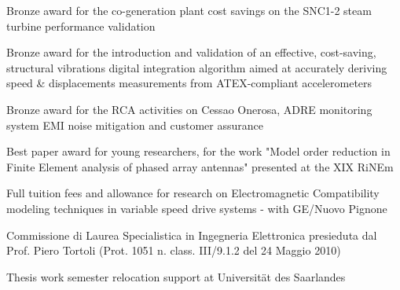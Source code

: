 \documentclass[9pt,a4paper,ragged2e,withhyper]{altacv} %
\begin{document}
\begin{paracol}{2}
{Bronze award for the co-generation plant cost savings on the SNC1-2 steam turbine performance validation}
\divider

{Bronze award for the introduction and validation of an effective, cost-saving, structural vibrations digital integration algorithm aimed at accurately deriving speed \& displacements measurements from ATEX-compliant accelerometers}
\divider

{Bronze award for the RCA activities on Cessao Onerosa, ADRE monitoring system EMI noise mitigation and customer assurance}
\divider

{Best paper award for young researchers, for the work "Model order reduction in Finite Element analysis of phased array antennas" presented at the XIX RiNEm}
\divider

{Full tuition fees and allowance for research on Electromagnetic Compatibility modeling techniques in variable speed drive systems - with GE/Nuovo Pignone}
\divider

{Commissione di Laurea Specialistica in Ingegneria Elettronica presieduta dal Prof. Piero Tortoli (Prot. 1051 n. class. III/9.1.2 del 24 Maggio 2010)}
\divider

{Thesis work semester relocation support at Universit\"at des Saarlandes}


\medskip
{}
\medskip
{}
\medskip
{}




\end{paracol}
\end{document}
